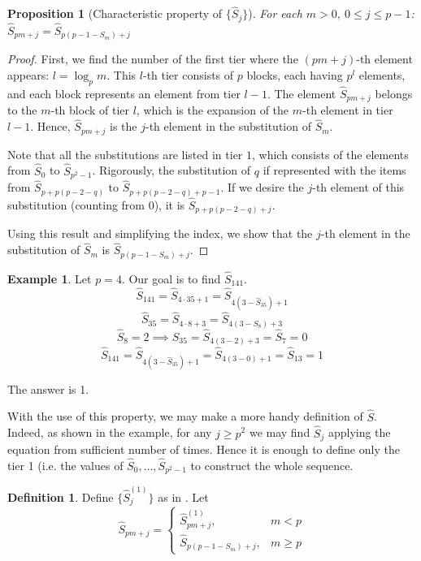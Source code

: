 \documentclass[a4paper]{article}
\theoremstyle{plain}
\newtheorem{proposition}{Proposition}[section]
\theoremstyle{definition}
\newtheorem{definition}{Definition}
\newtheorem*{example}{Example}
\begin{document}
\begin{proposition}[Characteristic property of $\{\hat{S}_j\}$]\label{charProp}
For each $m > 0,\ 0 \le j \le p-1$: $\hat{S}_{pm+j}=\hat{S}_{p(p-1-S_m) + j}$
\end{proposition}
\begin{proof}
First, we find the number of the first tier where the $(pm+j)$-th element appears: $l = \log_p{m}$. This $l$-th tier consists of $p$ blocks, each having $p^l$ elements, and each block represents an element from tier $l-1$. The element  $\hat{S}_{pm+j}$ belongs to the $m$-th block of tier $l$, which is the expansion of the $m$-th element in  tier $l-1$. Hence,  
$\hat{S}_{pm+j}$ is the $j$-th element in the substitution of $\hat{S}_m$.

Note that all the substitutions are listed in tier $1$, which consists of the elements from $\hat{S}_0$ to $\hat{S}_{p^2-1}$.
Rigorously, the substitution of $q$ if represented with the items from $\hat{S}_{p + p(p-2-q)}$ to $\hat{S}_{p + p(p-2-q) + p-1}$. If we desire the $j$-th element of this substitution (counting from 0), it is $\hat{S}_{p + p(p-2-q) + j}$. 

Using this result and simplifying the index, we show that the $j$-th element in the substitution of $\hat{S}_m$ is $\hat{S}_{p(p-1-S_m) + j}$. 
\end{proof}
\begin{example}
Let $p=4$. Our goal is to find $\hat{S}_{141}$.
$$ \hat{S}_{141} = \hat{S}_{4 \cdot 35 + 1} = \hat{S}_{4(3-\hat{S}_{35}) +1}$$
$$ \hat{S}_{35} = \hat{S}_{4 \cdot 8 + 3} = \hat{S}_{4(3-S_{8}) +3}$$
$$\hat{S}_8 = 2 \implies \hat{S}_{35}=\hat{S}_{4(3-2)+3}=\hat{S}_7=0$$
$$\hat{S}_{141}=\hat{S}_{4(3-\hat{S}_{35}) +1} = \hat{S}_{4(3-0)+1} = \hat{S}_{13}=1$$

The answer is 1.

\end{example}

With the use of this property, we may make a more handy definition of $\hat{S}$. Indeed, as shown in the example, for any $j \ge p^2$ we may find $\hat{S}_j$ applying the equation from  sufficient number of times. Hence it is enough to define only the tier 1 (i.e. the values of $\hat{S}_0, \ldots, \hat{S}_{p^2-1}$ to construct the whole sequence.
\begin{definition}\label{sm_good_def}
Define $\{\hat{S}_j^{(1)}\}$ as in . Let
$$ \hat{S}_{pm+j} =
 \begin{cases}
     \hat{S}_{pm+j}^{(1)}, & m < p \\
     \hat{S}_{p(p-1-S_m) + j}, & m \ge p
 \end{cases}
$$
\end{definition}
\end{document}
